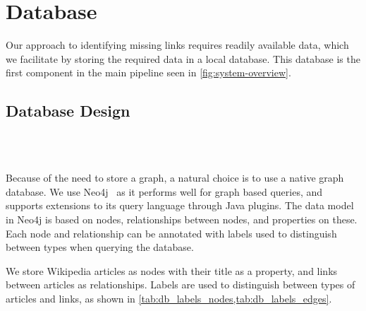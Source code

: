 \section{Database}\label{sec:db}


Our approach to identifying missing links requires readily available data, which we facilitate by storing the required data in a local database. This database is the first component in the main pipeline seen in \cref{fig:system-overview}. 

\subsection{Database Design}\label{sec:db_design}

\\
\\

Because of the need to store a graph, a natural choice is to use a native graph database. We use Neo4j~\cite{neo4j} as it performs well for graph based queries, and supports extensions to its query language through Java plugins. The data model in Neo4j is based on nodes, relationships between nodes, and properties on these. Each node and relationship can be annotated with labels used to distinguish between types when querying the database.

We store Wikipedia articles as nodes with their title as a property, and links between articles as relationships. Labels are used to distinguish between types of articles and links, as shown in \cref{tab:db_labels_nodes,tab:db_labels_edges}.

